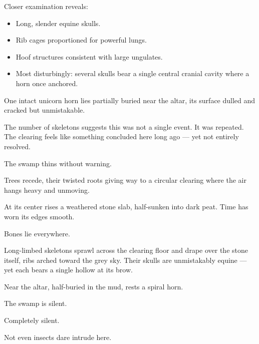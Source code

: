 {Closer examination reveals:
\begin{itemize}
	\item Long, slender equine skulls.
	\item Rib cages proportioned for powerful lungs.
	\item Hoof structures consistent with large ungulates.
	\item Most disturbingly: several skulls bear a single central cranial cavity where a horn once anchored.
\end{itemize}
One intact unicorn horn lies partially buried near the altar, its surface dulled and cracked but unmistakable.

The number of skeletons suggests this was not a single event. It was repeated. The clearing feels like something concluded here long ago — yet not entirely resolved.}

\begin{DndReadAloud}
	The swamp thins without warning.

	Trees recede, their twisted roots giving way to a circular clearing where the air hangs heavy and unmoving.

	At its center rises a weathered stone slab, half-sunken into dark peat. Time has worn its edges smooth.

	Bones lie everywhere.

	Long-limbed skeletons sprawl across the clearing floor and drape over the stone itself, ribs arched toward the grey 	sky. Their skulls are unmistakably equine — yet each bears a single hollow at its brow.

	Near the altar, half-buried in the mud, rests a spiral horn.

	The swamp is silent.

	Completely silent.

	Not even insects dare intrude here.
\end{DndReadAloud}